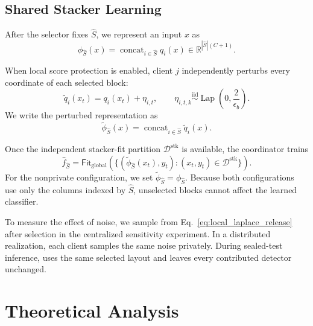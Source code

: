 \subsection{Shared Stacker Learning}

After the selector fixes $\widehat S$, we represent an input $x$ as
\begin{equation}
\phi_{\widehat S}(x)=
\operatorname{concat}_{i\in\widehat S}q_i(x)
\in\mathbb R^{|\widehat S|(C+1)}.
\label{eq:selected_representation}
\end{equation}

 When local score protection is enabled,
client $j$ independently perturbs
every coordinate of each selected block:
\begin{equation}
\widetilde q_i(x_t)=q_i(x_t)+\eta_{i,t},
\qquad
\eta_{i,t,k}\overset{\mathrm{iid}}{\sim}
\operatorname{Lap}\!\left(0,\frac{2}{\epsilon_b}\right).
\label{eq:local_laplace_release}
\end{equation}
We write the perturbed representation as
\begin{equation}
\widetilde\phi_{\widehat S}(x)=
\operatorname{concat}_{i\in\widehat S}\widetilde q_i(x).
\label{eq:private_selected_representation}
\end{equation}

 Once the independent stacker-fit partition
$\mathcal D^{\mathrm{stk}}$ is available, the coordinator trains
\begin{equation}
\widehat f_{\widehat S}=\mathsf{Fit}_{\mathrm{global}}
\left(
\{(\widetilde\phi_{\widehat S}(x_t),y_t):
(x_t,y_t)\in\mathcal D^{\mathrm{stk}}\}
\right).
\label{eq:shared_stacker}
\end{equation}
For the nonprivate configuration, we set
$\widetilde\phi_{\widehat S}=\phi_{\widehat S}$. Because both configurations
use only the columns indexed by $\widehat S$, unselected blocks cannot affect
the learned classifier.

To measure the effect of noise, we sample from
Eq.~\ref{eq:local_laplace_release} after selection in the centralized
sensitivity experiment. In a distributed realization, each client samples the
same noise privately. During sealed-test inference, \Fname uses the same
selected layout and leaves every contributed detector unchanged.

\section{Theoretical Analysis}
\label{sec:method_analysis}

